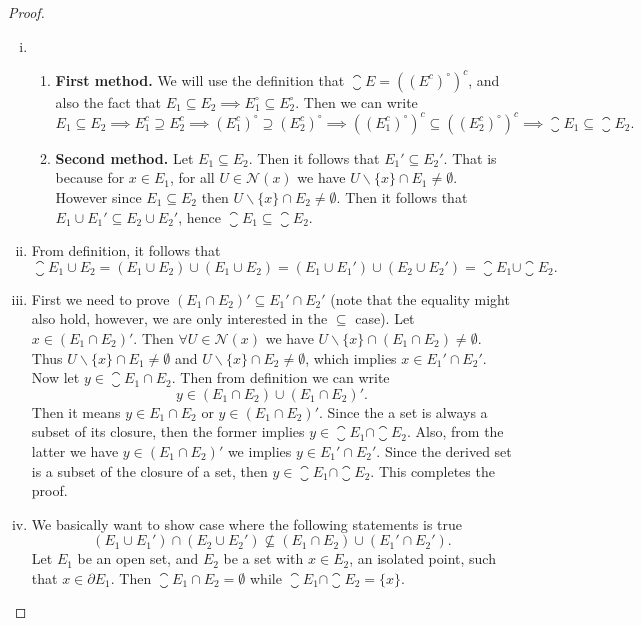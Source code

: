 \begin{proof}
	~\vspace{2pt}
	\begin{enumerate}[(i)]
		\item
		\begin{enumerate}
			\item \textbf{First method.} We will use the definition that $\closure{E} = ((E^c)^\circ)^c$, and also the fact that $E_1 \subseteq E_2 \implies E_1^\circ \subseteq E_2^\circ$. Then we can write
			\[ E_1 \subseteq E_2 \implies E_1^c \supseteq E_2^c \implies (E_1^c)^{\circ} \supseteq (E_2^c)^\circ \implies ((E_1^c)^\circ)^c \subseteq ((E_2^c)^\circ)^c \implies \boxed{\closure{E_1} \subseteq \closure{E_2}}. \]
			\item \textbf{Second method.} Let $E_1 \subseteq E_2$. Then it follows that $E_1' \subseteq E_2'$. That is because for $x\in E_1$, for all $U \in \mathcal{N}(x)$ we have $U \backslash \{x\} \cap E_1 \neq \emptyset$. However since $E_1 \subseteq E_2$ then $U \backslash \{x\} \cap E_2 \neq \emptyset$. Then it follows that $E_1 \cup E_1' \subseteq E_2 \cup E_2'$, hence $\closure{E_1} \subseteq \closure{E_2}$.
		\end{enumerate}
		\item From definition, it follows that 
		\[ \closure{E_1 \cup E_2} = (E_1 \cup E_2) \cup (E_1 \cup E_2) = (E_1 \cup E_1') \cup (E_2 \cup E_2') = \closure{E_1} \cup \closure{E_2}. \]
		
		\item First we need to prove $(E_1\cap E_2)' \subseteq E_1' \cap E_2'$ (note that the equality might also hold, however, we are only interested in the $\subseteq$ case). Let $x \in (E_1 \cap E_2)'$. Then $\forall U \in \mathcal{N}(x)$ we have $U\backslash\{x\} \cap {(E_1 \cap E_2)} \neq \emptyset$. Thus $U\backslash\{x\}\cap E_1 \neq \emptyset$ and $U\backslash\{x\}\cap E_2 \neq \emptyset$, which implies $x \in E_1' \cap E_2'$. \\
		Now let $y \in \closure{E_1 \cap E_2}$. Then from definition we can write
		\[ y \in (E_1\cap E_2) \cup (E_1 \cap E_2)'. \]
		Then it means $y \in E_1\cap E_2$ or $y \in (E_1 \cap E_2)'$. Since the a set is always a subset of its closure, then the former implies $y \in \closure{E_1}\cap\closure{E_2}$. Also, from the latter we have $y \in (E_1 \cap E_2)'$ we implies $y \in E_1' \cap E_2'$. Since the derived set is a subset of the closure of a set, then $y \in \closure{E_1} \cap \closure{E_2}$. This completes the proof.
		
		\item We basically want to show case where the following statements is true
		\[ (E_1 \cup E_1') \cap (E_2 \cup E_2') \not\subseteq (E_1 \cap E_2) \cup (E_1' \cap E_2'). \]
		Let $E_1$ be an open set, and $E_2$ be a set with $x\in E_2$, an isolated point, such that $x \in \partial E_1$. Then $\closure{E_1 \cap E_2} = \emptyset $ while $\closure{E_1} \cap \closure{E_2} = \{x\}$.
	\end{enumerate} 
\end{proof}

